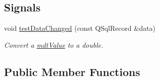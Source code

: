 \subsection*{Signals}
\begin{DoxyCompactItemize}
\item 
void \hyperlink{classmdt_tt_test_ab3eb0133a4db98b5be2b34473c9812bc}{test\-Data\-Changed} (const Q\-Sql\-Record \&data)
\begin{DoxyCompactList}\small\item\em Convert a \hyperlink{classmdt_value}{mdt\-Value} to a double. \end{DoxyCompactList}\end{DoxyCompactItemize}
\subsection*{Public Member Functions}
